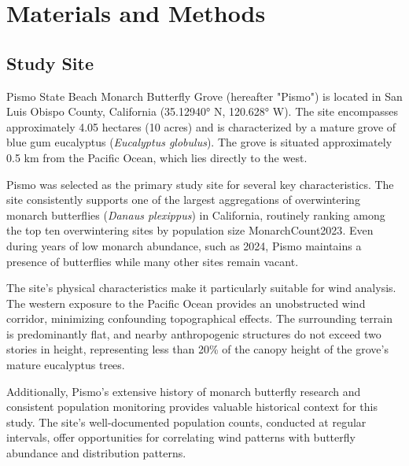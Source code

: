 \section{Materials and Methods}
\subsection{Study Site}
Pismo State Beach Monarch Butterfly Grove (hereafter "Pismo") is located in San Luis Obispo County, California (35.12940° N, 120.628° W). The site encompasses approximately 4.05 hectares (10 acres) and is characterized by a mature grove of blue gum eucalyptus (\textit{Eucalyptus globulus}). The grove is situated approximately 0.5 km from the Pacific Ocean, which lies directly to the west.

Pismo was selected as the primary study site for several key characteristics. The site consistently supports one of the largest aggregations of overwintering monarch butterflies (\textit{Danaus plexippus}) in California, routinely ranking among the top ten overwintering sites by population size {MonarchCount2023}. Even during years of low monarch abundance, such as 2024, Pismo maintains a presence of butterflies while many other sites remain vacant.

The site's physical characteristics make it particularly suitable for wind analysis. The western exposure to the Pacific Ocean provides an unobstructed wind corridor, minimizing confounding topographical effects. The surrounding terrain is predominantly flat, and nearby anthropogenic structures do not exceed two stories in height, representing less than 20\% of the canopy height of the grove's mature eucalyptus trees.

Additionally, Pismo's extensive history of monarch butterfly research and consistent population monitoring provides valuable historical context for this study. The site's well-documented population counts, conducted at regular intervals, offer opportunities for correlating wind patterns with butterfly abundance and distribution patterns.


